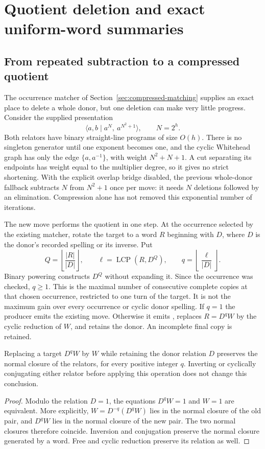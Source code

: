 \section{Quotient deletion and exact uniform-word summaries}
\label{sec:relator-powers}

\subsection{From repeated subtraction to a compressed quotient}

The occurrence matcher of Section~\ref{sec:compressed-matching} supplies an
exact place to delete a whole donor, but one deletion can make very little
progress. Consider the supplied presentation
\[
 \langle a,b\mid a^N,\ a^{N^2+1}\rangle,\qquad N=2^h.
\]
Both relators have binary straight-line programs of size $O(h)$. There is
no singleton generator until one exponent becomes one, and the cyclic
Whitehead graph has only the edge $\{a,a^{-1}\}$, with weight $N^2+N+1$.
A cut separating its endpoints has weight equal to the multiplier degree,
so it gives no strict shortening. With the explicit overlap bridge disabled,
the previous whole-donor fallback subtracts $N$ from $N^2+1$ once per move:
it needs $N$ deletions followed by an elimination. Compression alone has
not removed this exponential number of iterations.

The new move performs the quotient in one step. At the occurrence selected
by the existing matcher, rotate the target to a word $R$ beginning with
$D$, where $D$ is the donor's recorded spelling or its inverse. Put
\[
 Q=\left\lfloor\frac{|R|}{|D|}\right\rfloor,
 \qquad \ell=\operatorname{LCP}(R,D^Q),
 \qquad q=\left\lfloor\frac{\ell}{|D|}\right\rfloor.
\]
Binary powering constructs $D^Q$ without expanding it. Since the occurrence
was checked, $q\ge1$. This is the maximal number of consecutive complete
copies at that chosen occurrence, restricted to one turn of the target.
It is not the maximum gain over every occurrence or cyclic donor spelling.
If $q=1$ the producer emits the existing  move. Otherwise it
emits , replaces $R=D^qW$ by the cyclic reduction of
$W$, and retains the donor. An incomplete final copy is retained.

\begin{proposition}
Replacing a target $D^qW$ by $W$ while retaining the donor relation $D$
preserves the normal closure of the relators, for every positive integer
$q$. Inverting or cyclically conjugating either relator before applying
this operation does not change this conclusion.
\end{proposition}
\begin{proof}
Modulo the relation $D=1$, the equations $D^qW=1$ and $W=1$ are equivalent.
More explicitly, $W=D^{-q}(D^qW)$ lies in the normal closure of the old
pair, and $D^qW$ lies in the normal closure of the new pair. The two normal
closures therefore coincide. Inversion and conjugation preserve the normal
closure generated by a word. Free and cyclic reduction preserve its relation
as well.
\end{proof}

